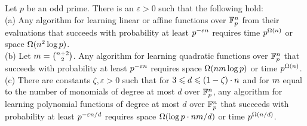 \begin{theorem}
Let $p$ be an odd prime.  There is an $\varepsilon>0$ such that the
following hold:\\
(a) Any
algorithm for learning linear or affine
functions over $\mathbb{F}_p^n$ from their evaluations
that succeeds with probability at least $p^{-\varepsilon n}$ requires 
time $p^{\Omega(n)}$ or space $\Omega(n^2\log p)$.\\
%
%
%
%
%
(b) 
Let  $m=\binom{n+2}2$. 
Any algorithm for learning quadratic functions over
$\mathbb{F}_p^n$ that succeeds with probability at least
$p^{-\varepsilon n}$ requires space $\Omega(nm \log p)$ or time $p^{\Omega(n)}$.\\
%
%
%
%
%
%
(c)
There are constants $\zeta,\varepsilon >0$ such that for 
$3\leqslant d\leqslant (1-\zeta) \cdot n$ and for $m$ equal to the number of monomials of degree at most $d$ over
$\mathbb{F}_p^n$,
any algorithm for learning polynomial functions of degree at most $d$ 
over
$\mathbb{F}_p^n$ that succeeds with probability at least
$p^{-\varepsilon n/d}$ requires space $\Omega(\log p \cdot nm/d)$ or time $p^{\Omega(n/d)}$.
\end{theorem}

